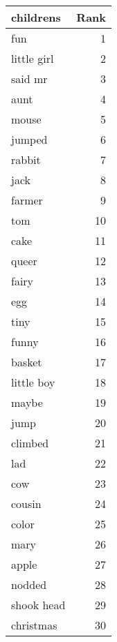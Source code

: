 \begin{table}
\label{tab:childrens_terms}
\begin{tabular}{lr}
\toprule
childrens & Rank \\
\midrule
fun & 1 \\
little girl & 2 \\
said mr & 3 \\
aunt & 4 \\
mouse & 5 \\
jumped & 6 \\
rabbit & 7 \\
jack & 8 \\
farmer & 9 \\
tom & 10 \\
cake & 11 \\
queer & 12 \\
fairy & 13 \\
egg & 14 \\
tiny & 15 \\
funny & 16 \\
basket & 17 \\
little boy & 18 \\
maybe & 19 \\
jump & 20 \\
climbed & 21 \\
lad & 22 \\
cow & 23 \\
cousin & 24 \\
color & 25 \\
mary & 26 \\
apple & 27 \\
nodded & 28 \\
shook head & 29 \\
christmas & 30 \\
\bottomrule
\end{tabular}
\end{table}
